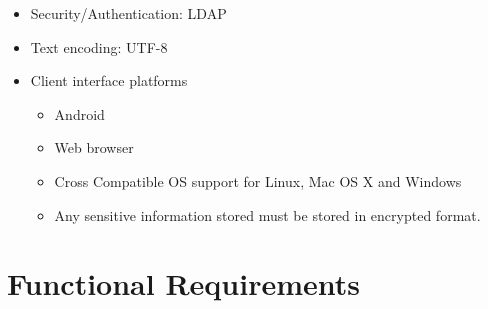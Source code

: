 \documentclass[10pt,a4paper]{article}
\begin{document}
                \begin{itemize}
                        \item Security/Authentication: LDAP
                \end{itemize}
                \begin{itemize}
                        \item Text encoding: UTF-8
                \end{itemize}
                \begin{itemize}
                        \item Client interface platforms
                                                        \begin{itemize}
                                                                \item Android
                                                                \item Web browser
                                                                \item Cross Compatible OS support for Linux, Mac OS X and Windows
                                                                \item Any sensitive information stored must be stored in encrypted format.
                                                        \end{itemize}                                           
                \end{itemize}                                           
                
\section{Functional Requirements}
\end{document}
